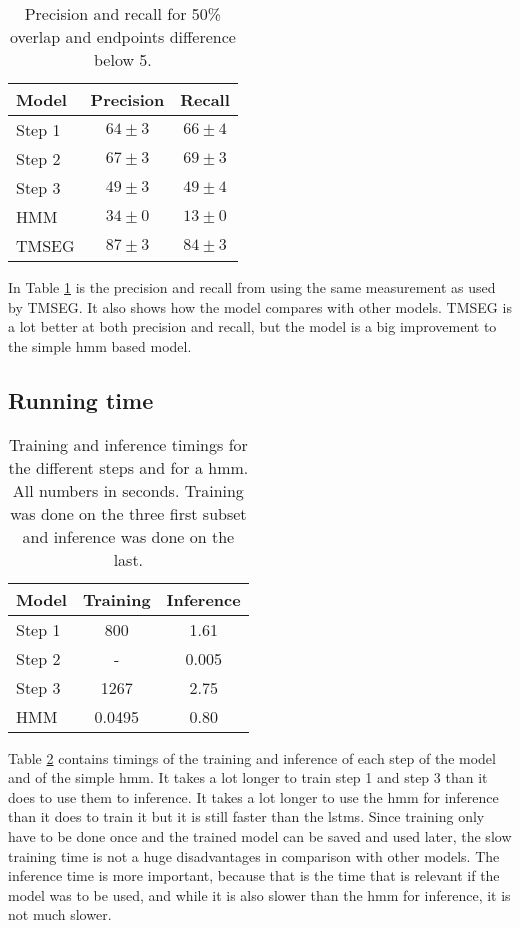 \begin{table}
	\centering 
	\begin{tabular}{l|c|c} 
		Model & Precision & Recall \\ \hline
		Step 1 & $64 \pm 3$ & $66 \pm 4$ \\ 
		Step 2 & $67 \pm 3$ & $69 \pm 3$ \\ 
		Step 3 & $49 \pm 3$ & $49 \pm 4$ \\
		HMM   & $34 \pm 0$ & $13 \pm 0$ \\ 
		TMSEG\cite{tmseg} & $87 \pm 3$ & $84 \pm 3$
	\end{tabular}
    \caption{Precision and recall for 50\% overlap and endpoints difference below 5.}
	\label{tab:pr50}
\end{table}

In Table \ref{tab:pr50} is the precision and recall from using the same 
measurement as used by TMSEG. It also shows how the model compares with 
other models. TMSEG is a lot better at both precision and recall, 
but the model is a big improvement to the simple \gls{hmm}
based model. 

\subsection{Running time}
\label{sec:time}



\begin{table}
	\centering 
	\begin{tabular}{l|c|c} 
		Model & Training & Inference \\ \hline
		Step 1 & 800 & 1.61 \\ 
		Step 2 & - & 0.005 \\ 
		Step 3 & 1267 & 2.75 \\
		HMM   & 0.0495 & 0.80
	\end{tabular}
	\caption{Training and inference timings for the different steps 
		and for a \gls{hmm}. All numbers in seconds. Training was done
		on the three first subset and inference was done on the last.}
	\label{tab:time}
\end{table}

Table \ref{tab:time} contains timings of the training and inference of each 
step of the model and of the simple \gls{hmm}. It takes a lot longer to train 
step 1 and step 3 than it does to use them to inference. 
It takes a lot longer to use the \gls{hmm} for inference than it does to train
it but it is still faster than the \glspl{lstm}. Since training only have to be
done once and the trained model can be saved and used later, the slow training 
time is not a huge disadvantages in comparison with other models. The inference
time is more important, because that is the time that is relevant if the model 
was to be used, and while it is also slower than the \gls{hmm} for inference,
it is not much slower.

